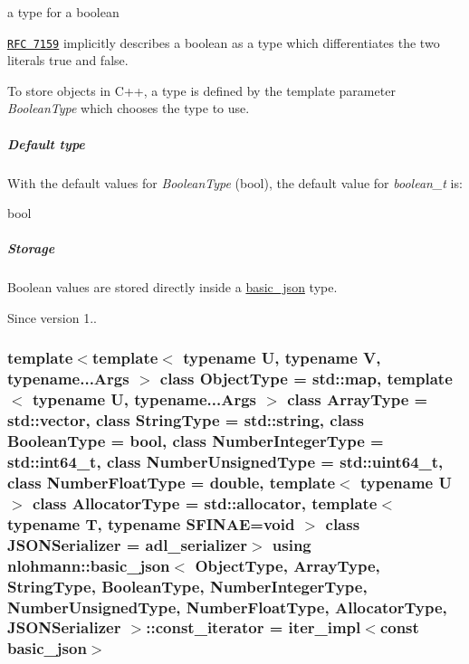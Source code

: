 a type for a boolean 

\href{http://rfc7159.net/rfc7159}{\tt R\+FC 7159} implicitly describes a boolean as a type which differentiates the two literals {\ttfamily true} and {\ttfamily false}.

To store objects in C++, a type is defined by the template parameter {\itshape Boolean\+Type} which chooses the type to use.

\subparagraph*{Default type}

With the default values for {\itshape Boolean\+Type} ({\ttfamily bool}), the default value for {\itshape boolean\+\_\+t} is\+:


\begin{DoxyCode}
\textcolor{keywordtype}{bool}
\end{DoxyCode}


\subparagraph*{Storage}

Boolean values are stored directly inside a \hyperlink{classnlohmann_1_1basic__json}{basic\+\_\+json} type.

\begin{DoxySince}{Since}
version 1.. 
\end{DoxySince}
\subsubsection[{\texorpdfstring{const\+\_\+iterator}{const_iterator}}]{\setlength{\rightskip}{0pt plus 5cm}template$<$template$<$ typename U, typename V, typename...\+Args $>$ class Object\+Type = std\+::map, template$<$ typename U, typename...\+Args $>$ class Array\+Type = std\+::vector, class String\+Type  = std\+::string, class Boolean\+Type  = bool, class Number\+Integer\+Type  = std\+::int64\+\_\+t, class Number\+Unsigned\+Type  = std\+::uint64\+\_\+t, class Number\+Float\+Type  = double, template$<$ typename U $>$ class Allocator\+Type = std\+::allocator, template$<$ typename T, typename S\+F\+I\+N\+A\+E=void $>$ class J\+S\+O\+N\+Serializer = adl\+\_\+serializer$>$ using {\bf nlohmann\+::basic\+\_\+json}$<$ Object\+Type, Array\+Type, String\+Type, Boolean\+Type, Number\+Integer\+Type, Number\+Unsigned\+Type, Number\+Float\+Type, Allocator\+Type, J\+S\+O\+N\+Serializer $>$\+::{\bf const\+\_\+iterator} =  {\bf iter\+\_\+impl}$<$const {\bf basic\+\_\+json}$>$}\hypertarget{classnlohmann_1_1basic__json_a41a70cf9993951836d129bb1c2b3126a}{}\label{classnlohmann_1_1basic__json_a41a70cf9993951836d129bb1c2b3126a}


